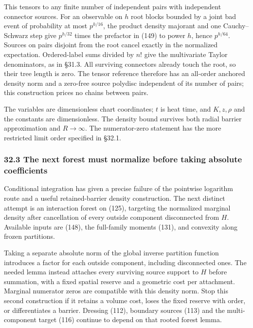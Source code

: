 \documentclass[11pt,a4paper]{article}
\begin{document}
This tensors to any finite number of independent pairs with independent
connector sources. For an observable on \(h\) root blocks bounded by a
joint bad event of probability at most \(p^{h/16}\), the product density
majorant and one Cauchy--Schwarz step give \(p^{h/32}\) times the
prefactor in (149) to power \(h\), hence \(p^{h/64}\). Sources on pairs
disjoint from the root cancel exactly in the normalized expectation.
Ordered-label sums divided by \(n!\) give the multivariate Taylor
denominators, as in §31.3. All surviving connectors already touch the
root, so their tree length is zero. The tensor reference therefore has
an all-order anchored density norm and a zero-free source polydisc
independent of its number of pairs; this construction prices no chains
between pairs.

The variables are dimensionless chart coordinates; \(t\) is heat time,
and \(K,z,\rho\) and the constants are dimensionless. The density bound
survives both radial barrier approximation and \(R\to\infty\). The
numerator-zero statement has the more restricted limit order specified
in §32.1.

\hypertarget{the-next-forest-must-normalize-before-taking-absolute-coefficients}{%
\subsubsection{32.3 The next forest must normalize before taking
absolute
coefficients}\label{the-next-forest-must-normalize-before-taking-absolute-coefficients}}

Conditional integration has given a precise failure of the pointwise
logarithm route and a useful retained-barrier density construction. The
next distinct attempt is an interaction forest on (125), targeting the
normalized marginal density after cancellation of every outside
component disconnected from \(H\). Available inputs are (148), the
full-family moments (131), and convexity along frozen partitions.

Taking a separate absolute norm of the global inverse partition function
introduces a factor for each outside component, including disconnected
ones. The needed lemma instead attaches every surviving source support
to \(H\) before summation, with a fixed spatial reserve and a geometric
cost per attachment. Marginal numerator zeros are compatible with this
density norm. Stop this second construction if it retains a volume cost,
loses the fixed reserve with order, or differentiates a barrier.
Dressing (112), boundary sources (113) and the multi-component target
(116) continue to depend on that rooted forest lemma.
\end{document}
